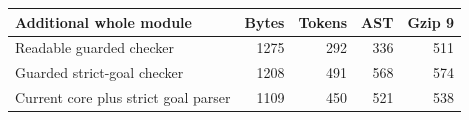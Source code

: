 \begin{center}\small\begin{tabular}{lrrrr}\toprule
Additional whole module & Bytes & Tokens & AST & Gzip 9\\\midrule
Readable guarded checker & 1275 & 292 & 336 & 511\\
Guarded strict-goal checker & 1208 & 491 & 568 & 574\\
Current core plus strict goal parser & 1109 & 450 & 521 & 538\\
\bottomrule\end{tabular}\end{center}

